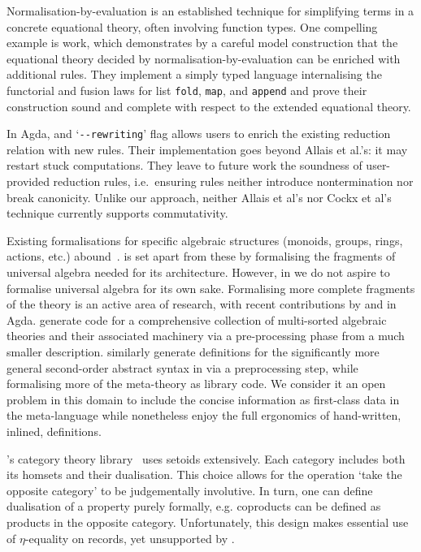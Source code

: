 Normalisation-by-evaluation is an established technique for
simplifying terms in a concrete equational theory, often involving
function types. One compelling example is 
work, which demonstrates by a careful model
construction that the equational theory decided by
nor\-ma\-li\-sa\-tion-by-eval\-u\-a\-tion can be enriched with additional
rules. They implement a simply typed language internalising the
functorial and fusion laws
for list {\tt fold}, {\tt map}, and {\tt append} and prove
their construction sound and complete with respect to the extended
equational theory.

In Agda,  and  `\texttt{-{}-rewriting}'
flag allows users to enrich the existing
reduction relation with new rules. Their implementation goes beyond Allais et al.'s:
it may restart stuck computations.
%
They leave to future work the soundness of user-provided reduction
rules, i.e.~ensuring rules neither introduce nontermination nor break
canonicity.
%
Unlike our approach, neither Allais et al's nor
Cockx et al's technique currently supports commutativity.

Existing formalisations for specific algebraic structures (monoids,
groups, rings, actions, etc.)
abound~\cite{mahboubi-tassi:mathcomp,agda-stdlib,hu-carette:agda-ct,lean-mathlib}. \Frexlib{}
is set apart from these by formalising the fragments of universal
algebra needed for its architecture. However, in \Frexlib{} we do not aspire
to formalise universal
algebra for its own sake.
Formalising more complete
fragments of the theory is an active area of research, with recent
contributions by \citet{GUNTHER2018147} and
\citet{DBLP:journals/corr/abs-2111-07936} in Agda.
\citet{carette-farmer-sharoda:leveraging-the-information-contained-in-theory-presentations}
generate \agda{} code for a comprehensive collection of multi-sorted
algebraic theories and their associated machinery via a pre-processing
phase from a much smaller description.
\citet{fiore-szamozvancev:soas-in-agda} similarly generate definitions
for the significantly more general second-order abstract syntax in
\agda{} via a preprocessing step, while formalising more of the
meta-theory as library code.  We consider it an open problem in this
domain to include the concise information as first-class data in the
meta-language while nonetheless enjoy the full ergonomics of
hand-written, inlined, definitions.

\agda{}'s category theory library~\cite{hu-carette:agda-ct} uses
setoids extensively. Each category includes both its homsets and their
dualisation. This choice allows for the operation `take the opposite
category' to be judgementally involutive. In turn, one can define
dualisation of a property purely formally, e.g. coproducts can be
defined as products in the opposite category. Unfortunately, this
design makes essential use of $\eta$-equality on records, yet
unsupported by \idris{}.

